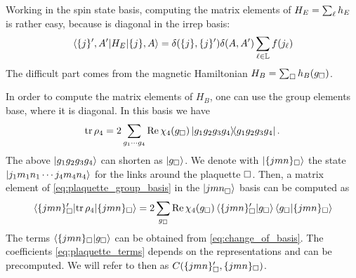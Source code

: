 Working in the spin state basis, computing the matrix elements of $H_E = \sum_{\ell} h_E$ is rather easy, because is diagonal in the \ac{irrep} basis:
\begin{equation}
    \mel{ \{j\}^{\prime}, A^{\prime}}{H_E}{ \{j\}, A} =
    \delta( \{j\}, \{j\}^{\prime}) \delta(A, A^{\prime}) \sum_{\ell \in \mathbb{L}} f(j_{\ell})
\end{equation}
The difficult part comes from the magnetic Hamiltonian $H_B = \sum_{\square} h_B(g_{\square})$.

In order to compute the matrix elements of $H_B$, one can use the group elements base, where it is diagonal.
In this basis we have
\begin{equation}
    \tr \rho_4 =
    2 \sum_{g_1 \cdots g_4} \Re \chi_4(g_{\square}) \ketbra{g_1 g_2 g_3 g_4}{g_1 g_2 g_3 g_4}.
    \label{eq:plaquette_group_basis}
\end{equation}
The above $\ket{g_1 g_2 g_3 g_4}$ can shorten as $\ket{g_{\square}}$.
We denote with $\ket{ \{jmn\}_{\square}}$ the state $\ket{j_1 m_1 n_1 \cdots j_4 m_4 n_4}$ for the links around the plaquette $\square$.
Then, a matrix element of \eqref{eq:plaquette_group_basis} in the $\ket{ {jmn}_{\square}}$ basis can be computed as
\begin{equation}
    \mel{ \{jmn\}_{\square}^{\prime}}{ \tr \rho_4}{ \{jmn\}_{\square}} =
    2 \sum_{g_{\square}} \Re \chi_4 (g_{\square})
        \braket{ \{jmn\}_{\square}^{\prime} }{g_{\square}}
        \braket{g_{\square}}{ \{jmn\}_{\square} }
    \label{eq:plaquette_terms}
\end{equation}
The terms $\braket{ \{jmn\}_{\square} }{ g_{\square} }$ can be obtained from \eqref{eq:change_of_basis}.
The coefficients \eqref{eq:plaquette_terms} depends on the representations and can be precomputed.
We will refer to then as $C( \{jmn\}_{\square}^{\prime}, \{jmn\}_{\square})$.

